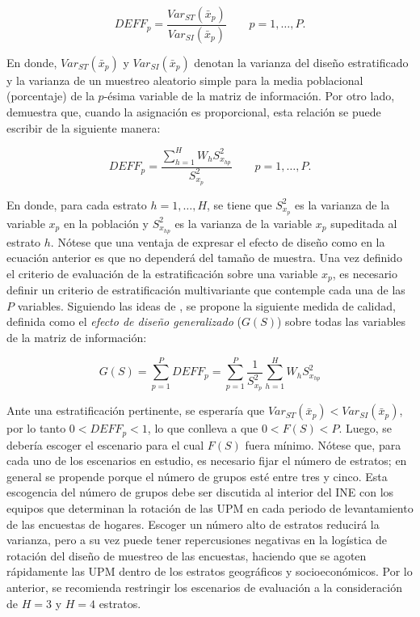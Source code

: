 \documentclass[12pt,spanish,]{book}
\begin{document}
\[
DEFF_p = \frac{Var_{ST}(\bar x _p)}{Var_{SI}(\bar x _p)} \ \ \ \ \ \ \ \ \ p = 1, \ldots, P.
\]

En donde, \(Var_{ST}(\bar x _p)\) y \(Var_{SI}(\bar x _p)\) denotan la varianza del diseño estratificado y la varianza de un muestreo aleatorio simple para la media poblacional (porcentaje) de la \(p\)-ésima variable de la matriz de información. Por otro lado, \textcite[página 184]{Gutierrez_2016} demuestra que, cuando la asignación es proporcional, esta relación se puede escribir de la siguiente manera:

\[
DEFF_p = \frac{ \sum_{h=1}^H W_h S^2_{x_{hp}} }{S^2_{x_p}} \ \ \ \ \ \ \ \ \ p = 1, \ldots, P.
\]

En donde, para cada estrato \(h = 1, \ldots, H\), se tiene que \(S^2_{x_p}\) es la varianza de la variable \(x_p\) en la población y \(S^2_{x_{hp}}\) es la varianza de la variable \(x_p\) supeditada al estrato \(h\). Nótese que una ventaja de expresar el efecto de diseño como en la ecuación anterior es que no dependerá del tamaño de muestra. Una vez definido el criterio de evaluación de la estratificación sobre una variable \(x_p\), es necesario definir un criterio de estratificación multivariante que contemple cada una de las \(P\) variables. Siguiendo las ideas de \textcite{Jarque_1981}, se propone la siguiente medida de calidad, definida como el \emph{efecto de diseño generalizado} (\(G(S)\)) sobre todas las variables de la matriz de información:

\[
G(S) = \sum_{p=1}^P DEFF_p = \sum_{p=1}^P \frac{1}{S^2_{x_p}}\sum_{h=1}^H W_h S^2_{x_{hp}}
\]

Ante una estratificación pertinente, se esperaría que \(Var_{ST}(\bar x _p) < Var_{SI}(\bar x _p)\), por lo tanto \(0 < DEFF_p < 1\), lo que conlleva a que \(0 < F(S) < P\). Luego, se debería escoger el escenario para el cual \(F(S)\) fuera mínimo. Nótese que, para cada uno de los escenarios en estudio, es necesario fijar el número de estratos; en general se propende porque el número de grupos esté entre tres y cinco. Esta escogencia del número de grupos debe ser discutida al interior del INE con los equipos que determinan la rotación de las UPM en cada periodo de levantamiento de las encuestas de hogares. Escoger un número alto de estratos reducirá la varianza, pero a su vez puede tener repercusiones negativas en la logística de rotación del diseño de muestreo de las encuestas, haciendo que se agoten rápidamente las UPM dentro de los estratos geográficos y socioeconómicos. Por lo anterior, se recomienda restringir los escenarios de evaluación a la consideración de \(H=3\) y \(H=4\) estratos.
\end{document}

